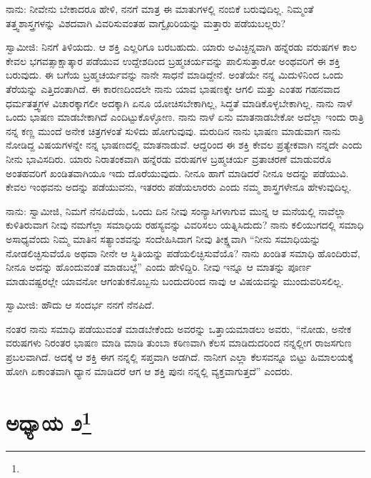 ನಾನು: ನೀವೇನು ಬೇಕಾದರೂ ಹೇಳಿ, ನನಗೆ ಮಾತ್ರ ಈ ಮಾತುಗಳಲ್ಲಿ ನಂಬಿಕೆ ಬರುವುದಿಲ್ಲ. ನಿಮ್ಮಂತೆ ತತ್ತ್ವಶಾಸ್ತ್ರಗಳನ್ನು ವಿಶದವಾಗಿ ವಿವರಿಸುವಂತಹ ವಾಗ್ವೈಖರಿಯನ್ನು ಮತ್ತಾರು ಪಡೆಯಬಲ್ಲರು?

ಸ್ವಾಮೀಜಿ: ನಿನಗೆ ತಿಳಿಯದು. ಆ ಶಕ್ತಿ ಎಲ್ಲರಿಗೂ ಬರಬಹುದು. ಯಾರು ಅವಿಚ್ಛಿನ್ನವಾಗಿ ಹನ್ನೆರಡು ವರುಷಗಳ ಕಾಲ ಕೇವಲ ಭಗವತ್ಸಾಕ್ಷಾತ್ಕಾರ ಪಡೆಯುವ ಉದ್ದೇಶದಿಂದ ಬ್ರಹ್ಮಚರ್ಯವನ್ನು ಪಾಲಿಸುತ್ತಾರೋ ಅಂಥವರಿಗೆ ಈ ಶಕ್ತಿ ಬರುವುದು. ಈ ಬಗೆಯ ಬ್ರಹ್ಮಚರ್ಯವನ್ನು ನಾನೇ ಸಾಧನೆ ಮಾಡಿದ್ದೇನೆ. ಅಂತೆಯೇ ನನ್ನ ಮಿದುಳಿನಿಂದ ಒಂದು ತೆರೆಯನ್ನು ಎತ್ತಿದಂತಾಗಿದೆ. ಈ ಕಾರಣದಿಂದಲೇ ನಾನು ಯಾವ ಭಾಷಣಕ್ಕೇ ಆಗಲಿ ಮತ್ತು ಎಂತಹ ಗಹನವಾದ ಧರ್ಮತತ್ತ್ವಗಳ ವಿಚಾರಕ್ಕಾಗಲೀ ಅದಕ್ಕಾಗಿ ಏನೂ ಯೋಚಿಸಬೇಕಾಗಿಲ್ಲ, ಸಿದ್ಧತೆ ಮಾಡಿಕೊಳ್ಳಬೇಕಾಗಿಲ್ಲ. ನಾನು ನಾಳೆ ಒಂದು ಭಾಷಣ ಮಾಡಬೇಕಾಗಿದೆ ಎಂದಿಟ್ಟುಕೊಳ್ಳೋಣ. ನಾನು ನಾಳೆ ಏನು ಮಾತನಾಡಬೇಕೋ ಅದೆಲ್ಲಾ ಇಂದು ರಾತ್ರಿ ನನ್ನ ಕಣ್ಣ ಮುಂದೆ ಅನೇಕ ಚಿತ್ರಗಳಂತೆ ಸುಳಿದು ಹೋಗುವುವು. ಮರುದಿನ ನಾನು ಭಾಷಣ ಮಾಡುವಾಗ ನಾನು ನೋಡಿದ್ದ ವಿಷಯಗಳನ್ನೇ ನನ್ನ ಭಾಷಣದಲ್ಲಿ ಮಾತನಾಡುವೆ. ಆದ್ದರಿಂದ ಈ ಶಕ್ತಿ ಕೇವಲ ಪ್ರತ್ಯೇಕವಾಗಿ ನನ್ನದೇ ಎಂದು ನೀನು ಭಾವಿಸದಿರು. ಯಾರು ನಿರಾತಂಕವಾಗಿ ಹನ್ನೆರಡು ವರುಷಗಳ ಬ್ರಹ್ಮಚರ್ಯ ವ್ರತಾಚರಣೆ ಮಾಡುವರೊ ಅಂತಹವರಿಗೆ ಖಂಡಿತವಾಗಿಯೂ ಇದು ದೊರೆಯುವುದು. ನೀನೂ ಹಾಗೆ ಮಾಡಿದರೆ ನೀನೂ ಅದನ್ನು ಪಡೆಯುವಿ. ಕೇವಲ ಇಂಥವನು ಅದನ್ನು ಪಡೆಯುವನು, ಇತರರು ಪಡೆಯಲಾರರು ಎಂದು ನಮ್ಮ ಶಾಸ್ತ್ರಗಳೇನೂ ಹೇಳುವುದಿಲ್ಲ.

ನಾನು: ಸ್ವಾಮೀಜಿ, ನಿಮಗೆ ನೆನಪಿದೆಯೆ, ಒಂದು ದಿನ ನೀವು ಸಂನ್ಯಾಸಿಗಳಾಗುವ ಮುನ್ನ ಆ ಮನೆಯಲ್ಲಿ ನಾವೆಲ್ಲಾ ಕುಳಿತಿರುವಾಗ ನೀವು ನಮಗೆಲ್ಲಾ ಸಮಾಧಿಯ ರಹಸ್ಯವನ್ನು ವಿವರಿಸಲು ಯತ್ನಿಸಿದುದು? ನಾನು ಕಲಿಯುಗದಲ್ಲಿ ಸಮಾಧಿ ಅಸಾಧ್ಯವೆಂದು ನಿಮ್ಮ ಮಾತಿನ ಸತ್ಯಾಂಶವನ್ನು ಸಂದೇಹಿಸಿದಾಗ ನೀವು ತೀಕ್ಷ್ಣವಾಗಿ “ನೀನು ಸಮಾಧಿಯನ್ನು ನೋಡಲಿಚ್ಛಿಸುವೆಯೊ ಅಥವಾ ನೀನೇ ಆ ಸ್ಥಿತಿಯನ್ನು ಪಡೆಯಲಿಚ್ಛಿಸುವೆಯೊ? ನಾನು ಖಂಡಿತ ಸಮಾಧಿ ಹೊಂದಿರುವೆ, ನೀನೂ ಅದನ್ನು ಹೊಂದುವಂತೆ ಮಾಡಬಲ್ಲೆ” ಎಂದು ಹೇಳಿದ್ದಿರಿ. ನೀವು ಇನ್ನೂ ಆ ಮಾತನ್ನು ಪೂರ್ಣ ಮಾಡುವಷ್ಟರಲ್ಲೇ ಯಾವನೋ ಆಗಂತುಕನೊಬ್ಬನು ಬಂದುದರಿಂದ ನಾವು ಆ ವಿಷಯವನ್ನು ಮುಂದುವರಿಸಲಿಲ್ಲ.

ಸ್ವಾಮೀಜಿ: ಹೌದು ಆ ಸಂದರ್ಭ ನನಗೆ ನೆನಪಿದೆ.

ನಂತರ ನಾನು ಸಮಾಧಿ ಪಡೆಯುವಂತೆ ಮಾಡಬೇಕೆಂದು ಅವರನ್ನು ಒತ್ತಾಯಮಾಡಲು ಅವರು, “ನೋಡು, ಅನೇಕ ವರುಷಗಳು ನಿರಂತರ ಭಾಷಣ ಮಾಡಿ ಮಾಡಿ ತುಂಬಾ ಕಠಿಣವಾಗಿ ಕೆಲಸ ಮಾಡಿದುದರಿಂದ ನನ್ನಲ್ಲೀಗ ರಾಜಸಗುಣ ಪ್ರಬಲವಾಗಿದೆ. ಅದಕ್ಕೆ ಆ ಶಕ್ತಿ ಈಗ ನನ್ನಲ್ಲಿ ಸಪ್ತವಾಗಿ ಅಡಗಿದೆ. ನಾನೀಗ ಎಲ್ಲಾ ಕೆಲಸವನ್ನೂ ಬಿಟ್ಟು ಹಿಮಾಲಯಕ್ಕೆ ಹೋಗಿ ಏಕಾಂತವಾಗಿ ಧ್ಯಾನ ಮಾಡಿದರೆ ಆಗ ಆ ಶಕ್ತಿ ಪುನಃ ನನ್ನಲ್ಲಿ ವ್ಯಕ್ತವಾಗುತ್ತದೆ” ಎಂದರು.

\newpage

\chapter[ಅಧ್ಯಾಯ ೨]{ಅಧ್ಯಾಯ ೨\protect\footnote{}}

